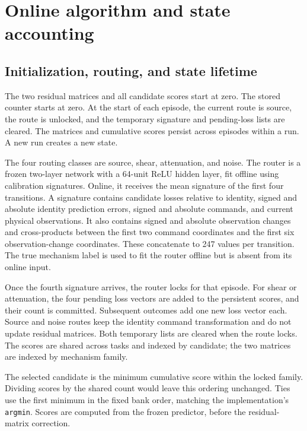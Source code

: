\section{Online algorithm and state accounting}
\label{app:algorithm}
\subsection{Initialization, routing, and state lifetime}
The two residual matrices and all candidate scores start at zero. The stored
counter starts at zero. At the start of each episode, the current route is
source, the route is unlocked, and the temporary signature and pending-loss
lists are cleared. The matrices and cumulative scores persist across episodes
within a run. A new run creates a new state.

The four routing classes are source, shear, attenuation, and noise. The router
is a frozen two-layer network with a 64-unit ReLU hidden layer, fit offline
using calibration signatures. Online, it receives the mean signature of the
first four transitions. A signature contains candidate losses relative to identity, signed and
absolute identity prediction errors, signed and absolute commands, and current
physical observations. It also contains signed and absolute observation changes
and cross-products between the first two command coordinates and the first
six observation-change coordinates. These concatenate to 247
values per transition. The true mechanism label is used to fit the router
offline but is absent from its online input.

Once the fourth signature arrives, the router locks for that episode. For
shear or attenuation, the four pending loss vectors are added to the persistent
scores, and their count is committed. Subsequent outcomes add one new loss
vector each. Source and noise routes keep the identity command transformation
and do not update residual matrices. Both temporary lists are cleared when
the route locks. The scores are shared across tasks and indexed by candidate;
the two matrices are indexed by mechanism family.

The selected candidate is the minimum cumulative score within the locked
family. Dividing scores by the shared count would leave this ordering
unchanged. Ties use the first minimum in the fixed bank order, matching the
implementation's \texttt{argmin}. Scores are computed from the frozen
predictor, before the residual-matrix correction.

